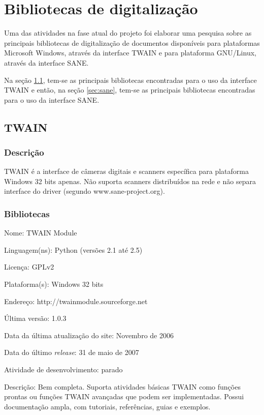 \section{Bibliotecas de digitalização}
\label{sec:pesquisa_libs}

Uma das atividades na fase atual do projeto foi elaborar uma pesquisa sobre as principais bibliotecas de digitalização de documentos disponíveis para plataformas Microsoft Windows, através da interface TWAIN e para plataforma GNU/Linux, através da interface SANE. 

Na seção \ref{sec:twain}, tem-se as principais bibliotecas encontradas para o uso da interface TWAIN e então, na seção \ref{sec:sane}, tem-se as principais bibliotecas encontradas para o uso da interface SANE.

\subsection{TWAIN}
\label{sec:twain}

\subsubsection{Descrição}
TWAIN é a interface de câmeras digitais e scanners específica para plataforma Windows 32 bits apenas. Não suporta scanners distribuídos na rede e não separa interface do driver (segundo www.sane-project.org).

\subsubsection{Bibliotecas}
\begin{description*}
	\item[Nome:] TWAIN Module
	\item[Linguagem(ns):] Python (versões 2.1 até 2.5)
	\item[Licença:] GPLv2
	\item[Plataforma(s):] Windows 32 bits
	\item[Endereço:] http://twainmodule.sourceforge.net
	\item[Última versão:] 1.0.3
	\item[Data da última atualização do site:] Novembro de 2006
	\item[Data do último {\it release}:] 31 de maio de 2007
	\item[Atividade de desenvolvimento:] parado
	\item[Descrição:] 
	Bem completa. Suporta atividades básicas TWAIN como funções prontas ou funções TWAIN avançadas que podem ser implementadas. Possui documentação ampla, com tutoriais, referências, guias e exemplos.
\end{description*}

